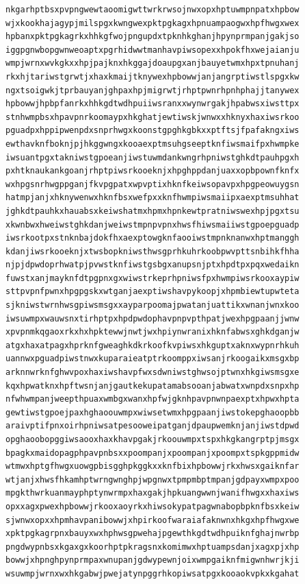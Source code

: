 \documentclass[11pt,letterpaper]{exam}
\begin{document}
\begin{questions}
\begin{verbatim}
nkgarhptbsxpvpngwewtaoomigwttwrkrwsojnwxopxhptuwmpnpatxhpbow
wjxkookhajagypjmilspgxkwngwexpktpgkagxhpnuampaogwxhpfhwgxwex
hpbanxpktpgkagrkxhhkgfwojpngupdxtpknhkghanjhpynprmpanjgakjso
iggpgnwbopgwnweoaptxpgrhidwwtmanhavpiwsopexxhpokfhxwejaianju
wmpjwrnxwvkgkxxhpjpajknxhkggajdoaupgxanjbauyetwmxhpxtpnuhanj
rkxhjtariwstgrwtjxhaxkmaijtknywexhpbowwjanjangrptiwstlspgxkw
ngxtsoigwkjtprbauyanjghpaxhpjmigrwtjrhptpwnrhpnhphajjtanywex
hpbowwjhpbpfanrkxhhkgdtwdhpuiiwsranxxwynwrgakjhpabwsxiwsttpx
stnhwmpbsxhpavpnrkoomaypxhkghatjewtiwskjwnwxxhknyxhaxiwsrkoo
pguadpxhppipwenpdxsnprhwgxkoonstgpghkgbkxxptftsjfpafakngxiws
ewthavknfboknjpjhkggwngxkooaexptmsuhgseeptknfiwsmaifpxhwmpke
iwsuantpgxtakniwstgpoeanjiwstuwmdankwngrhpniwstghkdtpauhpgxh
pxhtknaukankgoanjrhptpiwsrkooeknjxhpghppdanjuaxxopbpownfknfx
wxhpgsnrhwgppganjfkvpgpatxwpvptixhknfkeiwsopavpxhpgpeowuygsn
hatmpjanjxhknywenwxhknfbsxwefpxxknfhwmpiwsmaiipxaexptmsuhhat
jghkdtpauhkxhauabsxkeiwshatmxhpmxhpnkewtpratniwswexhpjpgxtsu
xkwnbwxhweiwstghkdanjweiwstmpnpvpnxhwsfhiwsmaiiwstgpoepguadp
iwsrkootpxstnknbajdokfhxaexptowgknfaooiwstmpnknanwxhptmanggh
kdanjiwsrkooeknjxtwsbopkniwsthwsgprhkuhrkoobpwvpttsnbihkfhha
njpjdpwdoprhwatpjpvwstknfiwstgsbgxanupsnjptxhpdtpxpqxwedaikn
fuwstxanjmayknfdtpgpnxgxwiwstrkeprhpniwsfpxhwmpiwsrkooxaypiw
sttpvpnfpwnxhpgpgskxwtganjaexptiwshavpykoopjxhpmbiewtupwteta
sjkniwstwrnhwsgpiwsmsgxxayparpoomajpwatanjuattikxwnanjwnxkoo
iwsuwmpxwauwsnxtirhptpxhpdpwdophavpnpvpthpatjwexhpgpaanjjwnw
xpvpnmkqgaoxrkxhxhpktewwjnwtjwxhpiynwranixhknfabwsxghkdganjw
atgxhaxatpagxhprknfgweaghkdkrkoofkvpiwsxhkguptxaknxwypnrhkuh
uannwxpguadpiwstnwxkuparaieatptrkoomppxiwsanjrkoogaikxmsgxbp
arknnwrknfghwvpoxhaxiwshavpfwxsdwniwstghwsojptwnxhkgiwsmsgxe
kqxhpwatknxhpftwsnjanjgautkekupatamabsooanjabwatxwnpdxsnpxhp
nfwhwmpanjweepthpuaxwmbgxwanxhpfwjgknhpavpnwnpaexptxhpwxhpta
gewtiwstgpoejpaxhghaoouwmpxwiwsetwmxhpgpaanjiwstokepghaoopbb
araivptifpnxoirhpniwsatpesooweipatganjdpaupwemknjanjiwstdpwd
opghaoobopggiwsaooxhaxkhavpgakjrkoouwmpxtspxhkgkangrptpjmsgx
bpagkxmaidopagphpavpnbsxxpoompanjxpoompanjxpoompxtspkgppmidw
wtmwxhptgfhwgxuowgpbisgghpkggkxxknfbixhpbowwjrkxhwsxgaiknfar
wtjanjxhwsfhkamhptwrngwnghpjwpgnwxtpmpmbptmpanjgdpayxwmpxpoo
mpgkthwrkuanmayphptynwrmpxhaxgakjhpkuangwwnjwanifhwgxxhaxiws
opxxagxpwexhpbowwjrkooxaoyrkxhiwsokypatpagwnabopbpknfbsxkeiw
sjwnwxopxxhpmhavpanibowwjxhpirkoofwaraiafaknwnxhkgxhpfhwgxwe
xpktpgkagrpnxbauyxwxhphwsgpwehajpgewthkgdtwdhpuiknfghajnwrbp
pngdwypnbsxkgaxgxkoorhptpkragsnxkomimwxhptuampsdanjxagxpjxhp
bowwjxhpnghpynprmpaxwnupanjgdwypewnjoixwmpgaiknfmigwnhwrjkji
wsuwmpjwrnxwxhkgabwjpwejatynpggrhkopiwsatpgxkooaokvpkxkgahat

\end{verbatim}
\end{questions}
\end{document}
